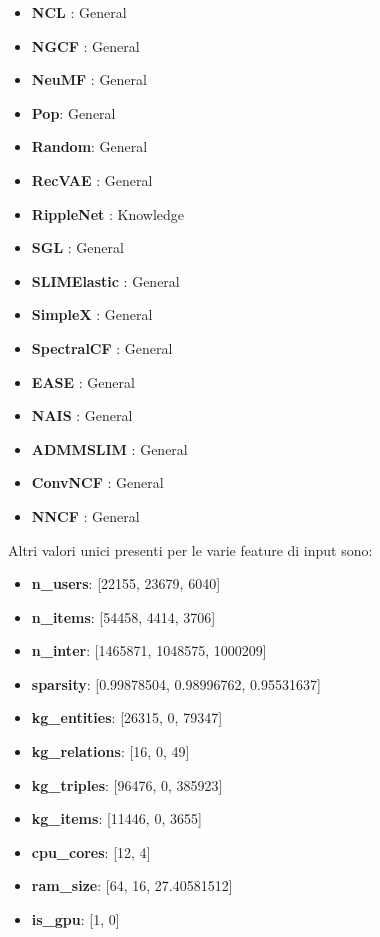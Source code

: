 \begin{itemize}
    \item \textbf{NCL} \cite{NCL}: General
    \item \textbf{NGCF} \cite{NGCF}: General
    \item \textbf{NeuMF} \cite{NeuMF}: General
    \item \textbf{Pop}: General
    \item \textbf{Random}: General
    \item \textbf{RecVAE} \cite{RecVAE}: General
    \item \textbf{RippleNet} \cite{RippleNet}: Knowledge
    \item \textbf{SGL} \cite{SGL}: General
    \item \textbf{SLIMElastic} \cite{SLIMElastic}: General
    \item \textbf{SimpleX} \cite{SimpleX}: General
    \item \textbf{SpectralCF} \cite{SpectralCF}: General
    \item \textbf{EASE} \cite{EASE}: General
    \item \textbf{NAIS} \cite{NAIS}: General
    \item \textbf{ADMMSLIM} \cite{ADMMSLIM}: General
    \item \textbf{ConvNCF} \cite{ConvNCF}: General
    \item \textbf{NNCF} \cite{NNCF}: General
\end{itemize}

Altri valori unici presenti per le varie feature di input sono:
\begin{itemize}
    \item \textbf{n\_users}: [22155, 23679, 6040]
    \item \textbf{n\_items}: [54458, 4414, 3706]
    \item \textbf{n\_inter}: [1465871, 1048575, 1000209]
    \item \textbf{sparsity}: [0.99878504, 0.98996762, 0.95531637]
    \item \textbf{kg\_entities}: [26315, 0, 79347]
    \item \textbf{kg\_relations}: [16, 0, 49]
    \item \textbf{kg\_triples}: [96476, 0, 385923]
    \item \textbf{kg\_items}: [11446, 0, 3655]
    \item \textbf{cpu\_cores}: [12, 4]
    \item \textbf{ram\_size}: [64, 16, 27.40581512]
    \item \textbf{is\_gpu}: [1, 0]
\end{itemize}
